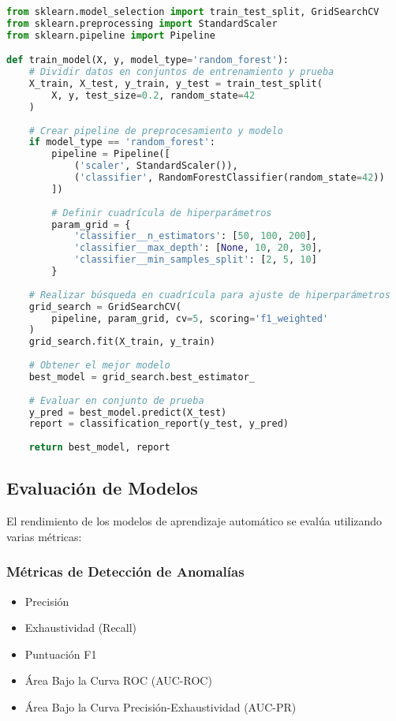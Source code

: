 \begin{lstlisting}[language=Python, caption=Pipeline de Entrenamiento de Modelos]
from sklearn.model_selection import train_test_split, GridSearchCV
from sklearn.preprocessing import StandardScaler
from sklearn.pipeline import Pipeline

def train_model(X, y, model_type='random_forest'):
    # Dividir datos en conjuntos de entrenamiento y prueba
    X_train, X_test, y_train, y_test = train_test_split(
        X, y, test_size=0.2, random_state=42
    )
    
    # Crear pipeline de preprocesamiento y modelo
    if model_type == 'random_forest':
        pipeline = Pipeline([
            ('scaler', StandardScaler()),
            ('classifier', RandomForestClassifier(random_state=42))
        ])
        
        # Definir cuadrícula de hiperparámetros
        param_grid = {
            'classifier__n_estimators': [50, 100, 200],
            'classifier__max_depth': [None, 10, 20, 30],
            'classifier__min_samples_split': [2, 5, 10]
        }
    
    # Realizar búsqueda en cuadrícula para ajuste de hiperparámetros
    grid_search = GridSearchCV(
        pipeline, param_grid, cv=5, scoring='f1_weighted'
    )
    grid_search.fit(X_train, y_train)
    
    # Obtener el mejor modelo
    best_model = grid_search.best_estimator_
    
    # Evaluar en conjunto de prueba
    y_pred = best_model.predict(X_test)
    report = classification_report(y_test, y_pred)
    
    return best_model, report
\end{lstlisting}

\subsection{Evaluación de Modelos}
El rendimiento de los modelos de aprendizaje automático se evalúa utilizando varias métricas:

\subsubsection{Métricas de Detección de Anomalías}
\begin{itemize}
    \item Precisión
    \item Exhaustividad (Recall)
    \item Puntuación F1
    \item Área Bajo la Curva ROC (AUC-ROC)
    \item Área Bajo la Curva Precisión-Exhaustividad (AUC-PR)
\end{itemize}

